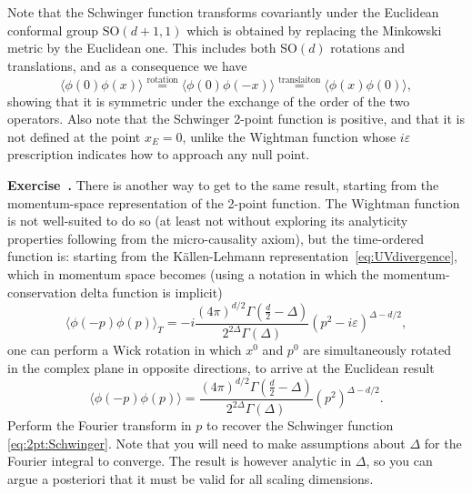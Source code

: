 \documentclass[a4paper,12pt]{article}
\newcommand{\SO}{\text{SO}}
\numberwithin{equation}{section}
\newcounter{exercise}[section]
\newenvironment{exercise}[1][]%
	{\refstepcounter{exercise}\bigskip
	\begin{mdframed}[backgroundcolor=gray!20, linewidth=0]
	\noindent\textbf{Exercise~\thesection.\theexercise #1} \rmfamily}
  	{\end{mdframed}\bigskip}
\begin{document}
Note that the Schwinger function transforms covariantly under the Euclidean conformal group $\SO(d + 1, 1)$ which is obtained by replacing the Minkowski metric by the Euclidean one. This includes both $\SO(d)$ rotations and translations, and as a consequence we have
\begin{equation}
	\langle \phi(0) \phi(x) \rangle
	\stackrel{\text{rotation}}{=} \langle \phi(0) \phi(-x) \rangle
	\stackrel{\text{translaiton}}{=} \langle \phi(x) \phi(0) \rangle,
\end{equation}
showing that it is symmetric under the exchange of the order of the two operators.
Also note that the Schwinger 2-point function is positive, and that it is not defined at the point $x_E = 0$, unlike the Wightman function whose $i \varepsilon$ prescription indicates how to approach any null point.
%
\begin{exercise}
	There is another way to get to the same result, starting from
	the momentum-space representation of the 2-point function. 
	The Wightman function is not well-suited to do so
	(at least not without exploring its analyticity properties 
	following from the micro-causality axiom),
	but the time-ordered function is: starting from the
	Källen-Lehmann representation~\eqref{eq:UVdivergence},
	which in momentum space becomes (using a notation in which the 
	momentum-conservation delta function is implicit)
	$$
	\langle \phi(-p) \phi(p) \rangle_T
	= -i
	\frac{(4\pi)^{d/2} \Gamma\left( \frac{d}{2} - \Delta \right)}
	{2^{2\Delta} \Gamma(\Delta)}
	\left( p^2 - i \varepsilon \right)^{\Delta - d/2},
	$$
	one can perform a Wick rotation in which $x^0$ and $p^0$
	are simultaneously rotated in the complex plane in opposite
	directions, to arrive at the Euclidean result
	$$
	\langle \phi(-p) \phi(p) \rangle
	= 
	\frac{(4\pi)^{d/2} \Gamma\left( \frac{d}{2} - \Delta \right)}
	{2^{2\Delta} \Gamma(\Delta)}
	\left( p^2  \right)^{\Delta - d/2}.
	$$
	Perform the Fourier transform in $p$ to recover the 
	Schwinger function \eqref{eq:2pt:Schwinger}.
	Note that you will need to make assumptions about $\Delta$
	for the Fourier integral to converge. The result is 
	however analytic in $\Delta$, so you can argue a posteriori
	that it must be valid for all scaling dimensions.
\end{exercise}
\end{document}
